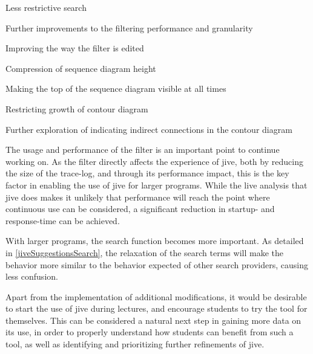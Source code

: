 \begin{itemize*}
	\item{Less restrictive search}
	\item{Further improvements to the filtering performance and granularity}
	\item{Improving the way the filter is edited}
	\item{Compression of sequence diagram height}
	\item{Making the top of the sequence diagram visible at all times}
	\item{Restricting growth of contour diagram}
	\item{Further exploration of indicating indirect connections in the contour diagram}
\end{itemize*}

The usage and performance of the filter is an important point to continue working on.
As the filter directly affects the experience of \gls{jive}, both by reducing the size of the trace-log, and through its performance impact, this is the key factor in enabling the use of \gls{jive} for larger programs.
While the live analysis that \gls{jive} does makes it unlikely that performance will reach the point where continuous use can be considered, a significant reduction in startup- and response-time can be achieved.

With larger programs, the search function becomes more important.
As detailed in \cref{jiveSuggestionsSearch}, the relaxation of the search terms will make the behavior more similar to the behavior expected of other search providers, causing less confusion.

Apart from the implementation of additional modifications, it would be desirable to start the use of \gls{jive} during lectures, and encourage students to try the tool for themselves.
This can be considered a natural next step in gaining more data on its use, in order to properly understand how students can benefit from such a tool, as well as identifying and prioritizing further refinements of \gls{jive}.


